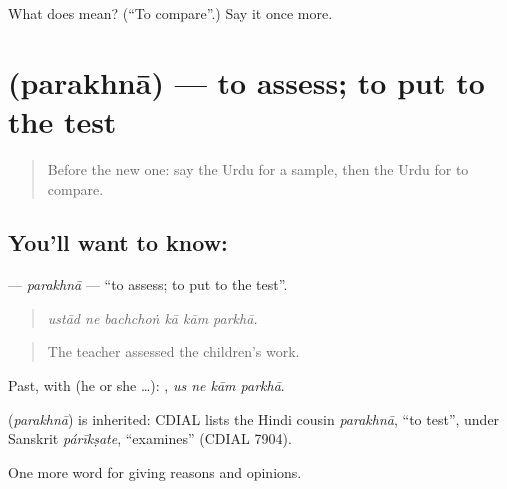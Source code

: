 \begin{tcolorbox}[breakable,colback=teal!4,colframe=teal!35!black,title={Before you move on}]
What does   mean? (\textquotedblleft{}To compare\textquotedblright{}.) Say it once more.
\end{tcolorbox}
\section[\texorpdfstring{\ur{پرکھنا} (parakhnā)}{پرکھنا (parakhnā)}]{ (parakhnā) — to assess; to put to the test}

\label{lesson:UR-C351-parakhna}



\begin{quote}
Before the new one: say the Urdu for a sample, then the Urdu for to compare.
\end{quote}

\subsection*{You'll want to know: }
\textbf{} — \emph{parakhnā} — \textquotedblleft{}to assess; to put to the test\textquotedblright{}.

\begin{quote}
     
\end{quote}

\begin{quote}
\emph{ustād ne bachchoṅ kā kām parkhā.}
\end{quote}

\begin{quote}
The teacher assessed the children's work.
\end{quote}

Past, with  (he or she …):    , \emph{us ne kām parkhā}.

\begin{cousinweb}
\textbf{} (\emph{parakhnā}) is inherited: CDIAL lists the Hindi cousin \emph{parakhnā}, \textquotedblleft{}to test\textquotedblright{}, under Sanskrit \emph{párīkṣate}, \textquotedblleft{}examines\textquotedblright{} (CDIAL 7904).
\end{cousinweb}

\begin{grammarlens}[title={What you've built}]
One more word for giving reasons and opinions.
\end{grammarlens}

